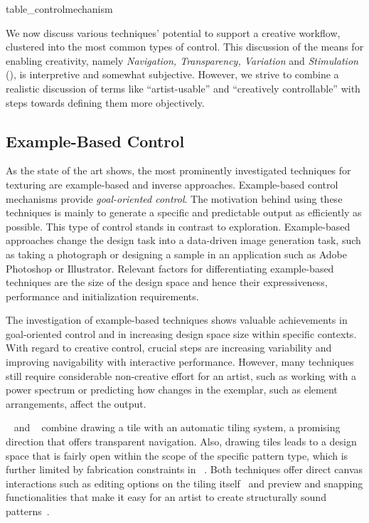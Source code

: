 {table_controlmechanism}

We now discuss various techniques' potential to support a creative workflow, clustered into the most common types of control. This discussion of the means for enabling creativity, namely \textit{Navigation, Transparency, Variation} and \textit{Stimulation} (), is interpretive and somewhat subjective. However, we strive to combine a realistic discussion of terms like ``artist-usable'' and ``creatively controllable'' with steps towards defining them more objectively.

\subsection{Example-Based Control}
\label{subsubsec:analysis_creative_means_example}

As the state of the art shows, the most prominently investigated techniques for texturing are example-based and inverse approaches. Example-based control mechanisms provide \textit{goal-oriented control}. The motivation behind using these techniques is mainly to generate a specific and predictable output as efficiently as possible. This type of control stands in contrast to exploration. Example-based approaches change the design task into a data-driven image generation task, such as taking a photograph or designing a sample in an application such as Adobe Photoshop or Illustrator. Relevant factors for differentiating example-based techniques are the size of the design space and hence their expressiveness, performance and initialization requirements. 

The investigation of example-based techniques shows valuable achievements in goal-oriented control and in increasing design space size within specific contexts. With regard to creative control, crucial steps are increasing variability and improving navigability with interactive performance. However, many techniques still require considerable non-creative effort for an artist, such as working with a power spectrum or predicting how changes in the exemplar, such as element arrangements, affect the output.

\citeauthor*{tu_2020_cct}~\cite{tu_2020_cct} and \citeauthor*{bian_2018_tpd}~\cite{bian_2018_tpd} combine drawing a tile with an automatic tiling system, a promising direction that offers transparent navigation. Also, drawing tiles leads to a design space that is fairly open within the scope of the specific pattern type, which is further limited by fabrication constraints in \citeauthor*{bian_2018_tpd}~\cite{bian_2018_tpd}. Both techniques offer direct canvas interactions such as editing options on the tiling itself~\cite{tu_2020_cct} and preview and snapping functionalities that make it easy for an artist to create structurally sound patterns~\cite{bian_2018_tpd}. 

